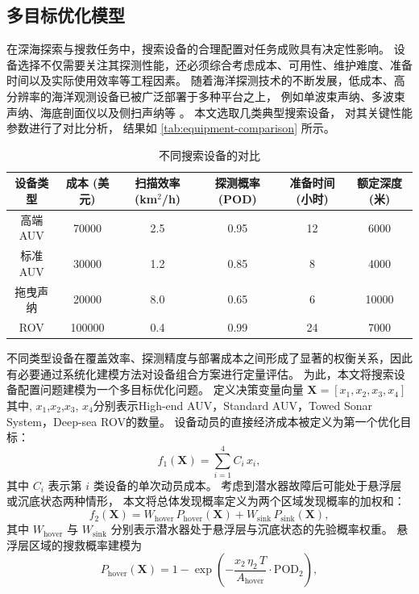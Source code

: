 \documentclass{mcmthesis}
\begin{document}
\subsection{多目标优化模型}
在深海探索与搜救任务中，搜索设备的合理配置对任务成败具有决定性影响。
设备选择不仅需要关注其探测性能，还必须综合考虑成本、可用性、维护难度、准备时间以及实际使用效率等工程因素。
随着海洋探测技术的不断发展，低成本、高分辨率的海洋观测设备已被广泛部署于多种平台之上，
例如单波束声纳、多波束声纳、海底剖面仪以及侧扫声纳等 \cite{pmid34883851}。
本文选取几类典型搜索设备，
对其关键性能参数进行了对比分析，
结果如 \autoref{tab:equipment-comparison} 所示。
\begin{table}[htbp]
\centering
\caption{不同搜索设备的对比}
\vspace{-0.4cm}
\label{tab:equipment-comparison}
\begin{tabular}{cccccc}
\toprule
设备类型& 成本 (美元) &扫描效率 (km$^2$/h) & 探测概率 (POD) &准备时间 (小时) & 额定深度 (米) \\
\midrule
高端AUV & 70000 & 2.5 & 0.95 & 12 & 6000 \\
标准AUV & 30000 & 1.2 & 0.85 & 8 & 4000 \\
拖曳声纳 & 20000 & 8.0 & 0.65 & 6 & 10000 \\
ROV & 100000 & 0.4 & 0.99 & 24 & 7000 \\
\bottomrule
\end{tabular}
\end{table}
不同类型设备在覆盖效率、探测精度与部署成本之间形成了显著的权衡关系，因此有必要通过系统化建模方法对设备组合方案进行定量评估。
为此，本文将搜索设备配置问题建模为一个多目标优化问题。
定义决策变量向量
$
\bm{X}=[x_1, x_2, x_3, x_4]
$
其中, $x_1$,$x_2$,$x_3$, $x_4$分别表示High-end AUV，Standard AUV，Towed Sonar System，Deep-sea ROV的数量。
设备动员的直接经济成本被定义为第一个优化目标：
\begin{equation}
f_1(\mathbf{X})=\sum_{i=1}^{4} C_i\,x_i,
\end{equation}
其中 $C_i$ 表示第 $i$ 类设备的单次动员成本。
考虑到潜水器故障后可能处于悬浮层或沉底状态两种情形，
本文将总体发现概率定义为两个区域发现概率的加权和：
\begin{equation}
f_2(\mathbf{X}) =
W_{\mathrm{hover}}\,P_{\mathrm{hover}}(\mathbf{X})
+
W_{\mathrm{sink}}\,P_{\mathrm{sink}}(\mathbf{X}),
\end{equation}
其中 $W_{\mathrm{hover}}$ 与 $W_{\mathrm{sink}}$ 
分别表示潜水器处于悬浮层与沉底状态的先验概率权重。
悬浮层区域的搜救概率建模为
\begin{equation}
P_{\mathrm{hover}}(\mathbf{X})
=
1-\exp\!\left(
-\frac{x_2\,\eta_2\,T}{A_{\mathrm{hover}}}\cdot \mathrm{POD}_2
\right),
\end{equation}
\end{document}
